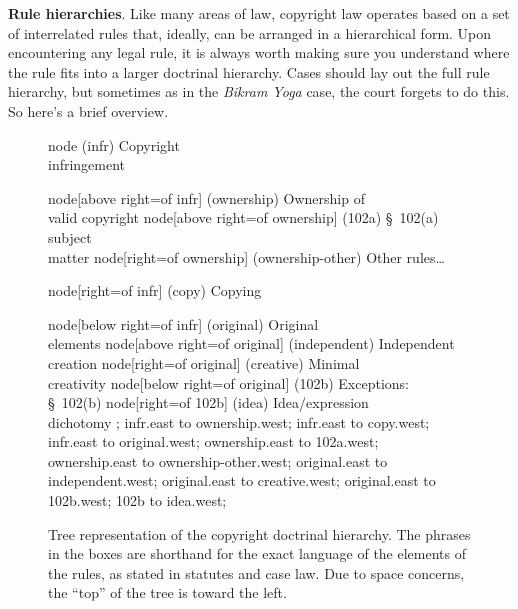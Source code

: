 
\item \textbf{Rule hierarchies}. Like many areas of law, copyright law operates
based on a set of interrelated rules that, ideally, can be arranged in a
hierarchical form. Upon encountering any legal rule, it is always worth making
sure you understand where the rule fits into a larger doctrinal hierarchy. Cases
should lay out the full rule hierarchy, but sometimes as in the \emph{Bikram
Yoga} case, the court forgets to do this. So here's a brief overview.

\begin{figure}

\begin{flowchart}
\blocks
node (infr) {Copyright\\infringement}

node[above right=of infr] (ownership) {Ownership of\\valid copyright}
node[above right=of ownership] (102a) {\S~102(a) subject\\matter}
node[right=of ownership] (ownership-other) {Other rules\ldots}

node[right=of infr] (copy) {Copying}

node[below right=of infr] (original) {Original\\elements}
node[above right=of original]  (independent) {Independent\\creation}
node[right=of original] (creative) {Minimal\\creativity}
node[below right=of original] (102b) {Exceptions:\\\S~102(b)}
node[right=of 102b] (idea) {Idea/expression\\dichotomy}
;
\conn[] infr.east to ownership.west;
\conn[] infr.east to copy.west;
\conn[] infr.east to original.west;
\conn[] ownership.east to 102a.west;
\conn[] ownership.east to ownership-other.west;
\conn[] original.east to independent.west;
\conn[] original.east to creative.west;
\conn[] original.east to 102b.west;
\conn[] 102b to idea.west;
\end{flowchart}

\caption{Tree representation of the copyright doctrinal hierarchy. The phrases
in the boxes are shorthand for the exact language of the elements of the rules,
as stated in statutes and case law. Due to space concerns, the ``top'' of the
tree is toward the left.}
\label{f:copyright-tree}
\end{figure}

